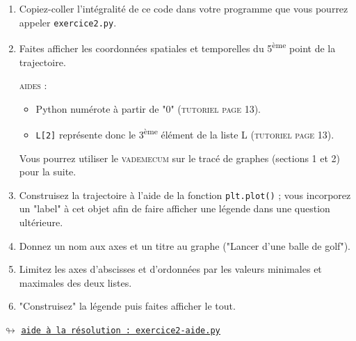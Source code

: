 \documentclass[11pt]{article}
\begin{document}
\begin{enumerate}
\item Copiez-coller l'intégralité de ce code dans votre programme que vous pourrez appeler \texttt{exercice2.py}.

 \item Faites afficher les coordonnées spatiales et temporelles du 5\textsuperscript{ème} point de la trajectoire.
 
 \smallskip
 \textsc{aides : }
\begin{itemize} 
\item Python numérote à partir de "0" (\textsc{tutoriel page 13}).
\item \texttt{L[2]} représente donc le 3\textsuperscript{ème} élément de la liste L (\textsc{tutoriel page 13}).
 \end{itemize}
 
 
 
 
 
 \medskip
 

\begin{center}

Vous pourrez utiliser le \textsc{vademecum} sur le tracé de graphes (sections 1 et 2) pour la suite.
\end{center} 
 
 
 \smallskip
 
 
 \item Construisez la trajectoire à l'aide de la fonction \texttt{plt.plot()} ; vous incorporez un "label" à cet objet afin de faire afficher une légende dans une question ultérieure.
 
 
 \medskip
 
 \item Donnez un nom aux axes et un titre au graphe ("Lancer d'une balle de golf").
 
 \medskip
 
 \item Limitez les axes d'abscisses et d'ordonnées par les valeurs minimales et maximales des deux listes.
 
 \medskip
 \item "Construisez" la légende puis faites afficher le tout.
 

\end{enumerate}

 
 
 






\begin{center}
 $\looparrowright$ \href{https://github.com/formationPythonPC-Juin/aides-formation/blob/master/exercice2-aide.py}{\underline{\texttt{aide à la résolution : exercice2-aide.py}}}
\end{center}
\end{document}
